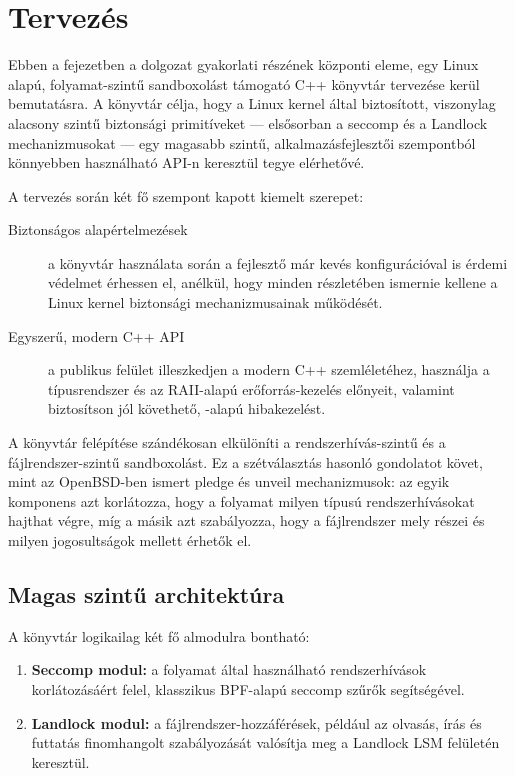 \chapter{Tervezés}

Ebben a fejezetben a dolgozat gyakorlati részének központi eleme, egy Linux
alapú, folyamat-szintű sandboxolást támogató C++ könyvtár tervezése kerül
bemutatásra. A könyvtár célja, hogy a Linux kernel által biztosított, viszonylag
alacsony szintű biztonsági primitíveket --- elsősorban a seccomp és a Landlock
mechanizmusokat --- egy magasabb szintű, alkalmazásfejlesztői szempontból
könnyebben használható API-n keresztül tegye elérhetővé.

A tervezés során két fő szempont kapott kiemelt szerepet:

\begin{description}
  \item[Biztonságos alapértelmezések]
  a könyvtár használata során a
  fejlesztő már kevés konfigurációval is érdemi védelmet érhessen el, anélkül,
  hogy minden részletében ismernie kellene a Linux kernel biztonsági
  mechanizmusainak működését.

  \item[Egyszerű, modern C++ API]
  a publikus felület illeszkedjen a
  modern C++ szemléletéhez, használja a típusrendszer és az RAII-alapú
  erőforrás-kezelés előnyeit, valamint biztosítson jól követhető,
  -alapú hibakezelést.
\end{description}

A könyvtár felépítése szándékosan elkülöníti a
rendszerhívás-szintű és a fájlrendszer-szintű sandboxolást. Ez a
szétválasztás hasonló gondolatot követ, mint az OpenBSD-ben ismert
pledge és unveil mechanizmusok: az egyik komponens azt
korlátozza, hogy a folyamat milyen típusú rendszerhívásokat hajthat végre, míg
a másik azt szabályozza, hogy a fájlrendszer mely részei és milyen jogosultságok
mellett érhetők el. \cite{openbsd_pledge_2} \cite{openbsd_unveil_2}

\section{Magas szintű architektúra}

A könyvtár logikailag két fő almodulra bontható:

\begin{enumerate}
  \item \textbf{Seccomp modul:} a folyamat által használható rendszerhívások
  korlátozásáért felel, klasszikus BPF-alapú seccomp szűrők segítségével.

  \item \textbf{Landlock modul:} a fájlrendszer-hozzáférések, például az
  olvasás, írás és futtatás finomhangolt szabályozását valósítja meg a
  Landlock LSM felületén keresztül.
\end{enumerate}

